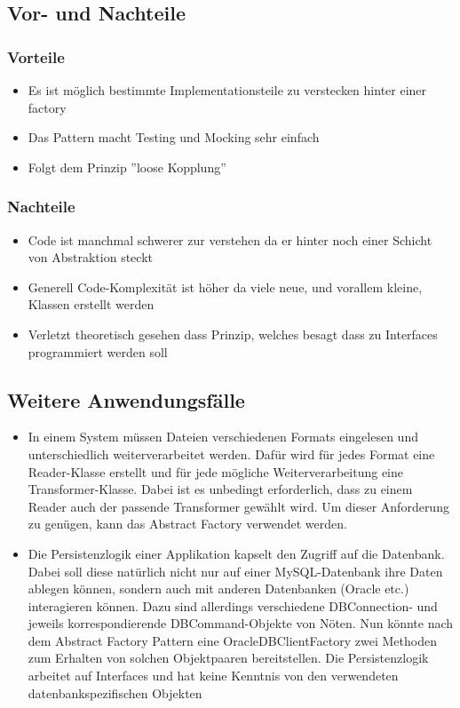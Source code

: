 \clearpage
\subsection{Vor- und Nachteile}
\cite{Smith-Kline}
\subsubsection{Vorteile}
\begin{itemize}
	\item Es ist möglich bestimmte Implementationsteile zu verstecken hinter einer factory
	\item Das Pattern macht Testing und Mocking sehr einfach 
	\item Folgt dem Prinzip ''loose Kopplung''
\end{itemize}

\subsubsection{Nachteile}
\begin{itemize}
	\item Code ist manchmal schwerer zur verstehen da er hinter noch einer Schicht von Abstraktion steckt
	\item Generell Code-Komplexität ist höher da viele neue, und vorallem kleine, Klassen erstellt werden
	\item Verletzt theoretisch gesehen dass Prinzip, welches besagt dass zu Interfaces programmiert werden soll
	\end{itemize}
	
\subsection{Weitere Anwendungsfälle}
\cite{PhilippHauer}
\begin{itemize}
	\item In einem System müssen Dateien verschiedenen Formats eingelesen und unterschiedlich weiterverarbeitet werden. Dafür wird für jedes Format eine Reader-Klasse erstellt und für jede mögliche Weiterverarbeitung eine Transformer-Klasse. Dabei ist es unbedingt erforderlich, dass zu einem Reader auch der passende Transformer gewählt wird. Um dieser Anforderung zu genügen, kann das Abstract Factory verwendet werden.
	\item Die Persistenzlogik einer Applikation kapselt den Zugriff auf die Datenbank. Dabei soll diese natürlich nicht nur auf einer MySQL-Datenbank ihre Daten ablegen können, sondern auch mit anderen Datenbanken (Oracle etc.) interagieren können. Dazu sind allerdings verschiedene DBConnection- und jeweils korrespondierende DBCommand-Objekte von Nöten. Nun könnte nach dem Abstract Factory Pattern eine OracleDBClientFactory zwei Methoden zum Erhalten von solchen Objektpaaren bereitstellen. Die Persistenzlogik arbeitet auf Interfaces und hat keine Kenntnis von den verwendeten datenbankspezifischen Objekten
\end{itemize}
